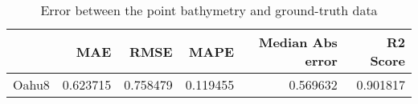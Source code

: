 \begin{table}[h!]
\caption{Error between the point bathymetry and ground-truth data}
\label{tab:Oahu8_lidar_error}
\begin{tabular}{lrrrrr}
\toprule
 & MAE & RMSE & MAPE & Median Abs error & R2 Score \\
\midrule
Oahu8 & 0.623715 & 0.758479 & 0.119455 & 0.569632 & 0.901817 \\
\bottomrule
\end{tabular}
\end{table}
